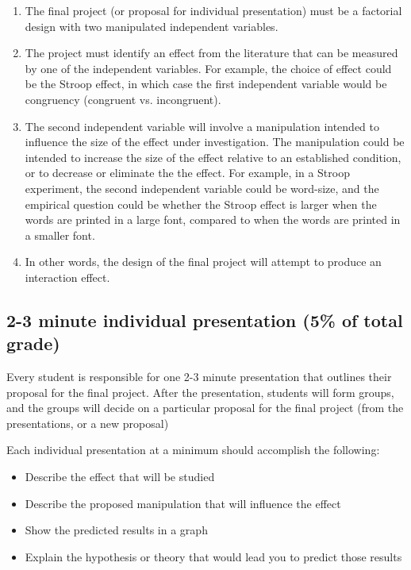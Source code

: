 \begin{enumerate}
\item The final project (or proposal for individual presentation) must be a factorial design with two manipulated independent variables.
\item The project must identify an effect from the literature that can be measured by one of the independent variables. For example, the choice of effect could be the Stroop effect, in which case the first independent variable would be congruency (congruent vs. incongruent).
\item The second independent variable will involve a manipulation intended to influence the size of the effect under investigation. The manipulation could be intended to increase the size of the effect relative to an established condition, or to decrease or eliminate the the effect. For example, in a Stroop experiment, the second independent variable could be word-size, and the empirical question could be whether the Stroop effect is larger when the words are printed in a large font, compared to when the words are printed in a smaller font.
\item In other words, the design of the final project will attempt to produce an interaction effect.
\end{enumerate}

\subsection{2-3 minute individual presentation (5\% of total grade)}

Every student is responsible for one 2-3 minute presentation that outlines their proposal for the final project. After the presentation, students will form groups, and the groups will decide on a particular proposal for the final project (from the presentations, or a new proposal)

Each individual presentation at a minimum should accomplish the following:
\begin{itemize}
\item Describe the effect that will be studied
\item Describe the proposed manipulation that will influence the effect
\item Show the predicted results in a graph
\item Explain the hypothesis or theory that would lead you to predict those results
\end{itemize}

